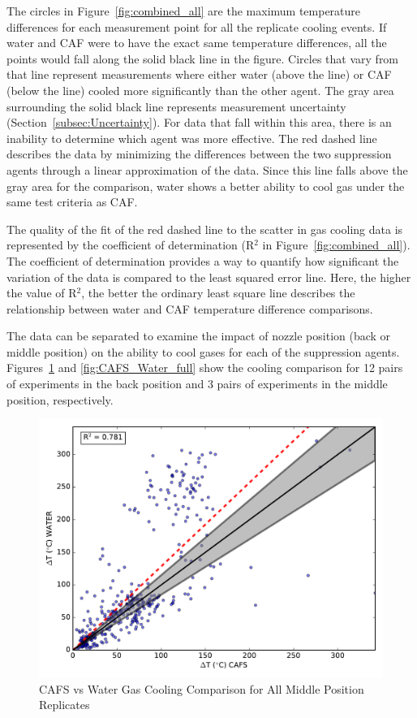 \documentclass[12pt,oneside]{book}
\begin{document}
The circles in Figure~\ref{fig:combined_all} are the maximum temperature differences for each measurement point for all the replicate cooling events. If water and CAF were to have the exact same temperature differences, all the points would fall along the solid black line in the figure. Circles that vary from that line represent measurements where either water (above the line) or CAF (below the line) cooled more significantly than the other agent. The gray area surrounding the solid black line represents measurement uncertainty (Section~\ref{subsec:Uncertainty}). For data that fall within this area, there is an inability to determine which agent was more effective. The red dashed line describes the data by minimizing the differences between the two suppression agents through a linear approximation of the data. Since this line falls above the gray area for the comparison, water shows a better ability to cool gas under the same test criteria as CAF.

The quality of the fit of the red dashed line to the scatter in gas cooling data is represented by the coefficient of determination (R$^2$ in Figure~\ref{fig:combined_all}). The coefficient of determination provides a way to quantify how significant the variation of the data is compared to the least squared error line. Here, the higher the value of R$^2$, the better the ordinary least square line describes the relationship between water and CAF temperature difference comparisons. 

The data can be separated to examine the impact of nozzle position (back or middle position) on the ability to cool gases for each of the suppression agents. Figures~\ref{fig:CAFS_Water_mid} and \ref{fig:CAFS_Water_full} show the cooling comparison for 12 pairs of experiments in the back position and 3 pairs of experiments in the middle position, respectively.

\begin{figure}[!ht]
	\includegraphics[width=.7\columnwidth]{../Figures/Gas_Cooling/Combined_mid_scatter}
	\caption{CAFS vs Water Gas Cooling Comparison for All Middle Position Replicates}
	\label{fig:CAFS_Water_mid}
\end{figure}
\end{document}

